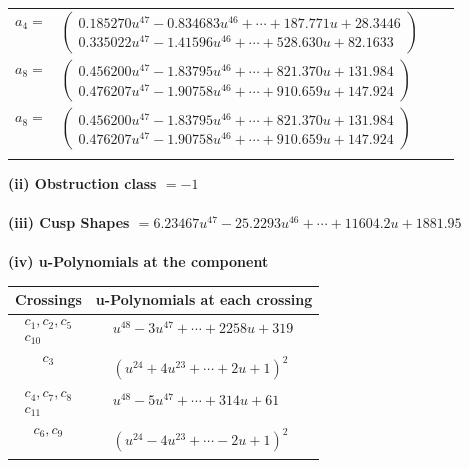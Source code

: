 \documentclass[1p]{elsarticle_modified}
\theoremstyle{definition}
\begin{document}
\begin{tabular}{m{7pt} m{180pt} m{7pt} m{180pt} }
\flushright $a_{4}=$&$\begin{pmatrix}0.185270 u^{47}-0.834683 u^{46}+\cdots+187.771 u+28.3446\\0.335022 u^{47}-1.41596 u^{46}+\cdots+528.630 u+82.1633\end{pmatrix}$ \\
\flushright $a_{8}=$&$\begin{pmatrix}0.456200 u^{47}-1.83795 u^{46}+\cdots+821.370 u+131.984\\0.476207 u^{47}-1.90758 u^{46}+\cdots+910.659 u+147.924\end{pmatrix}$\\ \flushright $a_{8}=$&$\begin{pmatrix}0.456200 u^{47}-1.83795 u^{46}+\cdots+821.370 u+131.984\\0.476207 u^{47}-1.90758 u^{46}+\cdots+910.659 u+147.924\end{pmatrix}$\\&\end{tabular}
\flushleft \textbf{(ii) Obstruction class $= -1$}\\~\\
\flushleft \textbf{(iii) Cusp Shapes $= 6.23467 u^{47}-25.2293 u^{46}+\cdots+11604.2 u+1881.95$}\\~\\
\newpage\renewcommand{\arraystretch}{1}
\flushleft \textbf{(iv) u-Polynomials at the component}\newline \\
\begin{tabular}{m{50pt}|m{274pt}}
Crossings & \hspace{64pt}u-Polynomials at each crossing \\
\hline $$\begin{aligned}c_{1},c_{2},c_{5}\\c_{10}\end{aligned}$$&$\begin{aligned}
&u^{48}-3 u^{47}+\cdots+2258 u+319
\end{aligned}$\\
\hline $$\begin{aligned}c_{3}\end{aligned}$$&$\begin{aligned}
&(u^{24}+4 u^{23}+\cdots+2 u+1)^{2}
\end{aligned}$\\
\hline $$\begin{aligned}c_{4},c_{7},c_{8}\\c_{11}\end{aligned}$$&$\begin{aligned}
&u^{48}-5 u^{47}+\cdots+314 u+61
\end{aligned}$\\
\hline $$\begin{aligned}c_{6},c_{9}\end{aligned}$$&$\begin{aligned}
&(u^{24}-4 u^{23}+\cdots-2 u+1)^{2}
\end{aligned}$\\
\hline
\end{tabular}\\~\\
\end{document}
